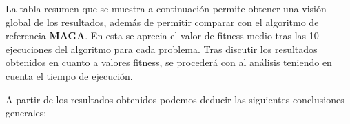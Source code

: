 La tabla resumen que se muestra a continuación permite obtener una visión global de los resultados, además de permitir comparar con el algoritmo de referencia \textbf{MAGA}\cite{MAGA-BigOpt}. En esta se aprecia el valor de fitness medio tras las 10 ejecuciones del algoritmo para cada problema. Tras discutir los resultados obtenidos en cuanto a valores fitness, se procederá con al análisis teniendo en cuenta el tiempo de ejecución.

\begin{table}[H]
	\centering
	\caption{Valores fitness medio. MAGA*: algoritmo de referencia.}
	\label{tabla:ResumenFitness}
\end{table}

A partir de los resultados obtenidos podemos deducir las siguientes conclusiones generales:

